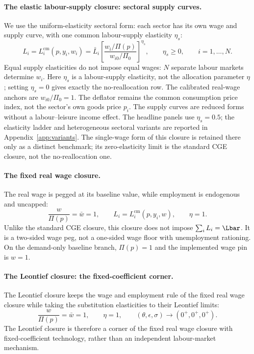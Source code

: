 \paragraph{The elastic labour-supply closure: sectoral supply curves.}
We use the uniform-elasticity sectoral form: each sector has its own wage
and supply curve, with one common labour-supply elasticity $\eta_s$:
\begin{equation}
L_i = L_i^{\mathrm{cm}}(p,y_i,w_i)
 = \bar{L}_i \left[\frac{w_i/\Pi(p)}{w_{i0}/\Pi_0}\right]^{\eta_s},
\qquad \eta_s \geq 0, \qquad i=1,\ldots,N.
\label{eq:closure-beta}
\end{equation}
Equal supply elasticities do not impose equal wages: $N$ separate labour
markets determine $w_i$. Here $\eta_s$ is a labour-supply elasticity, not
the allocation parameter $\eta$; setting $\eta_s = 0$ gives exactly the
no-reallocation row. The calibrated real-wage anchors are $w_{i0}/\Pi_0 = 1$.
The deflator remains the common consumption price index, not the sector's
own goods price $p_i$. The supply curves are reduced forms without a
labour--leisure income effect. The headline panels use $\eta_s = 0.5$;
the elasticity ladder and heterogeneous sectoral variants are reported in
Appendix~\ref{app:variants}. The single-wage form of this closure is
retained there only as a distinct benchmark; its zero-elasticity limit is
the standard CGE closure, not the no-reallocation one.

\paragraph{The fixed real wage closure.}
The real wage is pegged at its baseline value, while employment is
endogenous and uncapped:
\begin{equation}
\frac{w}{\Pi(p)} = \bar{w} = 1,
\qquad L_i = L_i^{\mathrm{cm}}(p,y_i,w),
\qquad \eta = 1.
\label{eq:closure-gamma}
\end{equation}
Unlike the standard CGE closure, this closure does not impose
$\sum_i L_i = \Lbar$.
It is a two-sided wage peg, not a one-sided wage floor with unemployment
rationing. On the demand-only baseline branch, $\Pi(p)=1$ and the
implemented wage pin is $w=1$.

\paragraph{The Leontief closure: the fixed-coefficient corner.}
The Leontief closure keeps the wage and employment rule of the fixed real
wage closure while taking the
substitution elasticities to their Leontief limits:
\begin{equation}
\frac{w}{\Pi(p)} = \bar{w} = 1,
\qquad \eta = 1,
\qquad (\theta,\epsilon,\sigma) \longrightarrow (0^+,0^+,0^+).
\label{eq:closure-delta}
\end{equation}
The Leontief closure is therefore a corner of the fixed real wage closure
with fixed-coefficient technology, rather than an independent
labour-market mechanism.

